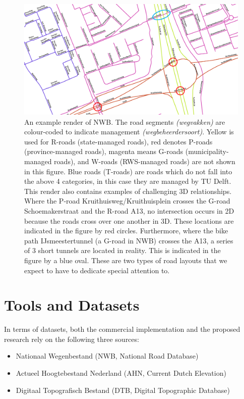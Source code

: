
\begin{figure}[hb]
    \centering
    \includegraphics[width=\linewidth]{p2/figs/nwb_sample_02.png} 
    \caption{An example render of NWB. The road segments \textit{(wegvakken)} are colour-coded to indicate management \textit{(wegbeheerdersoort)}. Yellow is used for R-roads (state-managed roads), red denotes P-roads (province-managed roads), magenta means G-roads (municipality-managed roads), and W-roads (RWS-managed roads) are not shown in this figure. Blue roads (T-roads) are roads which do not fall into the above 4 categories, in this case they are managed by TU Delft. This render also contains examples of challenging 3D relationships. Where the P-road Kruithuisweg/Kruithuisplein crosses the G-road Schoemakerstraat and the R-road A13, no intersection occurs in 2D because the roads cross over one another in 3D. These locations are indicated in the figure by red circles. Furthermore, where the bike path IJsmeestertunnel (a G-road in NWB) crosses the A13, a series of 3 short tunnels are located in reality. This is indicated in the figure by a blue oval. These are two types of road layouts that we expect to have to dedicate special attention to.}
    \label{fig:nwb}
\end{figure}

\section{Tools and Datasets}
\label{sec:td}

In terms of datasets, both the commercial implementation and the proposed research rely on the following three sources:

\begin{itemize}
\item Nationaal Wegenbestand (NWB, National Road Database)
\item Actueel Hoogtebestand Nederland (AHN, Current Dutch Elevation)
\item Digitaal Topografisch Bestand (DTB, Digital Topographic Database)
\end{itemize}

